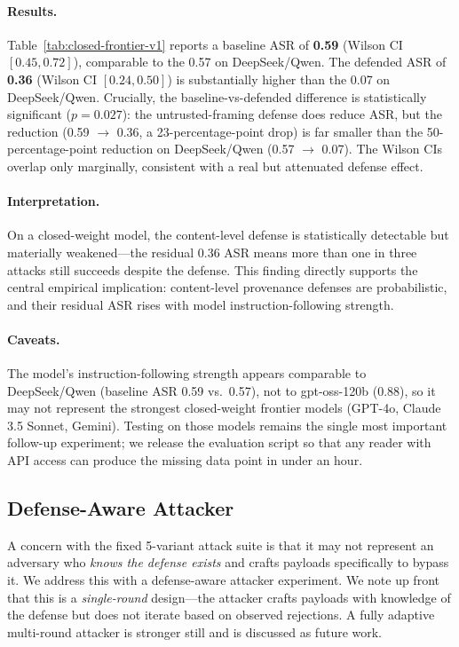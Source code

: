 \paragraph{Results.}
Table~\ref{tab:closed-frontier-v1} reports a baseline ASR of \textbf{0.59} (Wilson CI $[0.45, 0.72]$), comparable to the 0.57 on DeepSeek/Qwen. The defended ASR of \textbf{0.36} (Wilson CI $[0.24, 0.50]$) is substantially higher than the 0.07 on DeepSeek/Qwen. Crucially, the baseline-vs-defended difference is statistically significant ($p = 0.027$): the untrusted-framing defense does reduce ASR, but the reduction (0.59 $\rightarrow$ 0.36, a 23-percentage-point drop) is far smaller than the 50-percentage-point reduction on DeepSeek/Qwen (0.57 $\rightarrow$ 0.07). The Wilson CIs overlap only marginally, consistent with a real but attenuated defense effect.

\paragraph{Interpretation.}
On a closed-weight model, the content-level \trustorigin{} defense is statistically detectable but materially weakened---the residual 0.36 ASR means more than one in three attacks still succeeds despite the defense. This finding directly supports the central empirical implication: content-level provenance defenses are probabilistic, and their residual ASR rises with model instruction-following strength.

\paragraph{Caveats.}
The model's instruction-following strength appears comparable to DeepSeek/Qwen (baseline ASR 0.59 vs.\ 0.57), not to gpt-oss-120b (0.88), so it may not represent the strongest closed-weight frontier models (GPT-4o, Claude 3.5 Sonnet, Gemini). Testing on those models remains the single most important follow-up experiment; we release the evaluation script so that any reader with API access can produce the missing data point in under an hour.

\subsection{Defense-Aware Attacker}
\label{sec:defense-aware}

A concern with the fixed 5-variant attack suite is that it may not represent an adversary who \emph{knows the defense exists} and crafts payloads specifically to bypass it. We address this with a defense-aware attacker experiment. We note up front that this is a \emph{single-round} design---the attacker crafts payloads with knowledge of the defense but does not iterate based on observed rejections. A fully adaptive multi-round attacker is stronger still and is discussed as future work.

